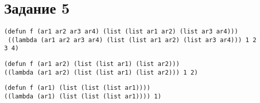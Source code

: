 \section{Задание 5}
\begin{center}
	\begin{lstlisting}[label=b5, caption={Выражение 1}]
(defun f (ar1 ar2 ar3 ar4) (list (list ar1 ar2) (list ar3 ar4)))
 ((lambda (ar1 ar2 ar3 ar4) (list (list ar1 ar2) (list ar3 ar4))) 1 2 3 4)
	\end{lstlisting}
	\begin{lstlisting}[label=a5, caption={Выражение 2}]
(defun f (ar1 ar2) (list (list ar1) (list ar2)))
((lambda (ar1 ar2) (list (list ar1) (list ar2))) 1 2)
	\end{lstlisting}
	\begin{lstlisting}[label=c5, caption={Выражение 3}]
(defun f (ar1) (list (list (list ar1))))
((lambda (ar1) (list (list (list ar1)))) 1)
	\end{lstlisting}
\end{center}
